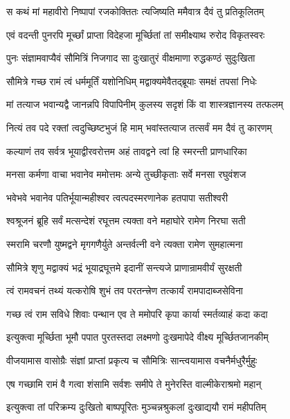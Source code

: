 \twolineshloka
{स कथं मां महावीरो निष्पापां रजकोक्तितः}
{त्यजिष्यति ममैवात्र दैवं तु प्रतिकूलितम्}%

\twolineshloka
{एवं वदन्ती पुनरपि मूर्च्छां प्राप्ता विदेहजा}
{मूर्च्छितां तां समीक्ष्याथ रुरोद विकृतस्वरः}%

\twolineshloka
{पुनः संज्ञामवाप्यैवं सौमित्रिं निजगाद सा}
{दुःखातुरं वीक्षमाणा रुद्धकण्ठं सुदुःखिता}%

\twolineshloka
{सौमित्रे गच्छ रामं त्वं धर्ममूर्तिं यशोनिधिम्}
{मद्वाक्यमेवैतद्ब्रूयाः समक्षं तपसां निधेः}%

\twolineshloka
{मां तत्याज भवान्यद्वै जानन्नपि विपापिनीम्}
{कुलस्य सदृशं किं वा शास्त्रज्ञानस्य तत्फलम्}%

\twolineshloka
{नित्यं तव पदे रक्तां त्वदुच्छिष्टभुजं हि माम्}
{भवांस्तत्याज तत्सर्वं मम दैवं तु कारणम्}%

\twolineshloka
{कल्याणं तव सर्वत्र भूयाद्वीरवरोत्तम}
{अहं तावद्वने त्वां हि स्मरन्ती प्राणधारिका}%

\twolineshloka
{मनसा कर्मणा वाचा भवानेव ममोत्तमः}
{अन्ये तुच्छीकृताः सर्वे मनसा रघुवंशज}%

\twolineshloka
{भवेभवे भवानेव पतिर्भूयान्महीश्वर}
{त्वत्पदस्मरणानेक हतपापा सतीश्वरी}%

\twolineshloka
{श्वश्रूजनं ब्रूहि सर्वं मत्सन्देशं रघूत्तम}
{त्यक्ता वने महाघोरे रामेण निरघा सती}%

\twolineshloka
{स्मरामि चरणौ युष्मद्वने मृगगणैर्युते}
{अन्तर्वत्नी वने त्यक्ता रामेण सुमहात्मना}%

\twolineshloka
{सौमित्रे शृणु मद्वाक्यं भद्रं भूयाद्रघूत्तमे}
{इदानीं सन्त्यजे प्राणान्रामवीर्यं सुरक्षती}%

\twolineshloka
{त्वं रामवचनं तथ्यं यत्करोषि शुभं तव}
{परतन्त्त्रेण तत्कार्यं रामपादाब्जसेविना}%

\twolineshloka
{गच्छ त्वं राम सविधे शिवाः पन्थान एव ते}
{ममोपरि कृपा कार्या स्मर्तव्याहं कदा कदा}%

\twolineshloka
{इत्युक्त्वा मूर्च्छिता भूमौ पपात पुरतस्तदा}
{लक्ष्मणो दुःखमापेदे वीक्ष्य मूर्च्छितजानकीम्}%

\twolineshloka
{वीजयामास वासोग्रैः संज्ञां प्राप्तां प्रकृत्य च}
{सौमित्रिः सान्त्वयामास वचनैर्मधुरैर्मुहुः}%


\twolineshloka
{एष गच्छामि रामं वै गत्वा शंसामि सर्वशः}
{समीपे ते मुनेरस्ति वाल्मीकेराश्रमो महान्}%

\twolineshloka
{इत्युक्त्वा तां परिक्रम्य दुःखितो बाष्पपूरितः}
{मुञ्चन्नश्रुकलां दुःखाद्ययौ रामं महीपतिम्}%

